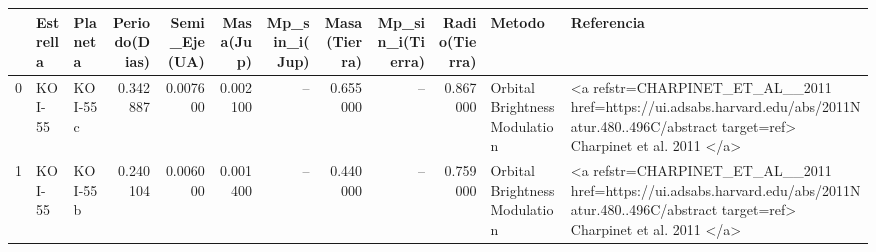 \begin{tabular}{lllrrrrrrrll}
\toprule
 & Estrella & Planeta & Periodo(Dias) & Semi_Eje(UA) & Masa(Jup) & Mp_sin_i(Jup) & Masa(Tierra) & Mp_sin_i(Tierra) & Radio(Tierra) & Metodo & Referencia \\
\midrule
0 & KOI-55 & KOI-55 c & 0.342887 & 0.007600 & 0.002100 & -- & 0.655000 & -- & 0.867000 & Orbital Brightness Modulation & <a refstr=CHARPINET_ET_AL__2011 href=https://ui.adsabs.harvard.edu/abs/2011Natur.480..496C/abstract target=ref> Charpinet et al. 2011 </a> \\
1 & KOI-55 & KOI-55 b & 0.240104 & 0.006000 & 0.001400 & -- & 0.440000 & -- & 0.759000 & Orbital Brightness Modulation & <a refstr=CHARPINET_ET_AL__2011 href=https://ui.adsabs.harvard.edu/abs/2011Natur.480..496C/abstract target=ref> Charpinet et al. 2011 </a> \\
\bottomrule
\end{tabular}
